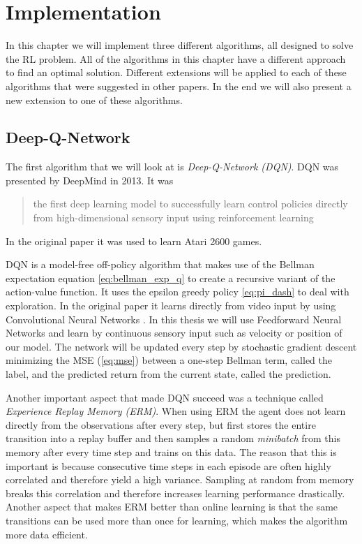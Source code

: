 \chapter{Implementation}
\label{section:implementation}

In this chapter we will implement three different algorithms, all designed to solve the RL problem.
All of the algorithms in this chapter have a different approach to find an optimal solution.
Different extensions will be applied to each of these algorithms that were suggested in other papers.
In the end we will also present a new extension to one of these algorithms.


\section{Deep-Q-Network}

The first algorithm that we will look at is \emph{Deep-Q-Network (DQN)}.
DQN was presented by DeepMind in 2013.
It was \blockquote[{\cite[1]{atari}}]{the first deep learning model to successfully learn control policies directly from high-dimensional sensory input using reinforcement learning}.
In the original paper it was used to learn Atari 2600 games.


DQN is a model-free off-policy algorithm that makes use of the Bellman expectation equation \ref{eq:bellman_exp_q} to create a recursive variant of the action-value function.
It uses the epsilon greedy policy \ref{eq:pi_dash} to deal with exploration.
In the original paper it learns directly from video input by using Convolutional Neural Networks \cite{cnn_wiki}.
In this thesis we will use Feedforward Neural Networks and learn by continuous sensory input such as velocity or position of our model.
The network will be updated every step by stochastic gradient descent minimizing the MSE (\ref{eq:mse}) between a one-step Bellman term, called the label, and the predicted return from the current state, called the prediction.

Another important aspect that made DQN succeed was a technique called \emph{Experience Replay Memory (ERM)}.
When using ERM the agent does not learn directly from the observations after every step, but first stores the entire transition into a replay buffer and then samples a random \emph{minibatch} from this memory after every time step and trains on this data.
The reason that this is important is because consecutive time steps in each episode are often highly correlated and therefore yield a high variance.
Sampling at random from memory breaks this correlation and therefore increases learning performance drastically.
Another aspect that makes ERM better than online learning is that the same transitions can be used more than once for learning, which makes the algorithm more data efficient.


